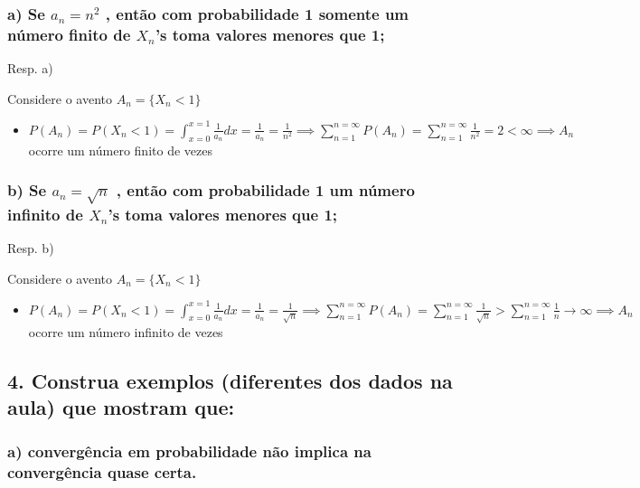 \documentclass[english]{article}
\begin{document}
\subsubsection*{\textmd{a) Se $a_{n}=n^{2}$ , então com probabilidade 1 somente
um número finito de $X_{n}$\textquoteright s toma valores menores
que 1;}}

Resp. a) 

Considere o avento $A_{n}=\{X_{n}<1\}$
\begin{itemize}
\item $P(A_{n})=P(X_{n}<1)=\int_{x=0}^{x=1}\frac{1}{a_{n}}dx=\frac{1}{a_{n}}=\frac{1}{n^{2}}\implies\sum_{n=1}^{n=\infty}P(A_{n})=\sum_{n=1}^{n=\infty}\frac{1}{n^{2}}=2<\infty\implies A_{n}$
ocorre um número finito de vezes
\end{itemize}

\subsubsection*{\textmd{b) Se $a_{n}=\sqrt{n}$ , então com probabilidade 1 um número
infinito de $X_{n}$\textquoteright s toma valores menores que 1;}}

Resp. b)

Considere o avento $A_{n}=\{X_{n}<1\}$
\begin{itemize}
\item $P(A_{n})=P(X_{n}<1)=\int_{x=0}^{x=1}\frac{1}{a_{n}}dx=\frac{1}{a_{n}}=\frac{1}{\sqrt{n}}\implies\sum_{n=1}^{n=\infty}P(A_{n})=\sum_{n=1}^{n=\infty}\frac{1}{\sqrt{n}}>\sum_{n=1}^{n=\infty}\frac{1}{n}\rightarrow\infty\implies A_{n}$
ocorre um número infinito de vezes
\end{itemize}

\subsection*{\textcompwordmark{}}


\subsection*{\textmd{4. Construa exemplos (diferentes dos dados na aula) que mostram
que: }}


\subsubsection*{\textmd{a) convergência em probabilidade não implica na convergência
quase certa.}}
\end{document}
